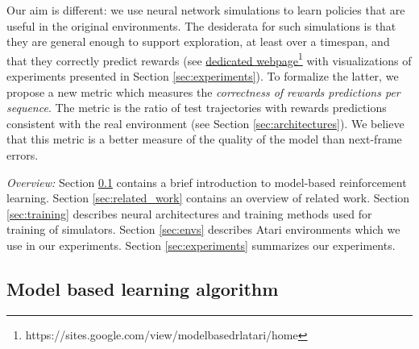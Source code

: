 Our aim is different: we use neural network simulations to learn policies that are useful in the original environments. The desiderata for such simulations is that they are general enough to support exploration, at least over a timespan, and that they correctly predict rewards (see \href{https://sites.google.com/view/modelbasedrlatari/home}{dedicated webpage\footnote{\url{https://sites.google.com/view/modelbasedrlatari/home}} with visualizations} of experiments presented in Section \ref{sec:experiments}).  To formalize the latter, we propose a new metric which measures the \textit{correctness of rewards predictions per sequence}. The metric is the ratio of test trajectories with rewards predictions consistent with the real environment (see Section \ref{sec:architectures}). We believe that this metric is a better measure of the quality of the model than next-frame errors.%


\emph{Overview:}
Section \ref{subsec:model} contains a brief introduction to model-based reinforcement learning. Section \ref{sec:related_work} contains an overview of related work. Section \ref{sec:training} describes neural architectures and training methods used for training of simulators. Section \ref{sec:envs} describes Atari environments which we use in our experiments.  Section \ref{sec:experiments} summarizes our experiments. %

\subsection{Model based learning algorithm}
\label{subsec:model}

